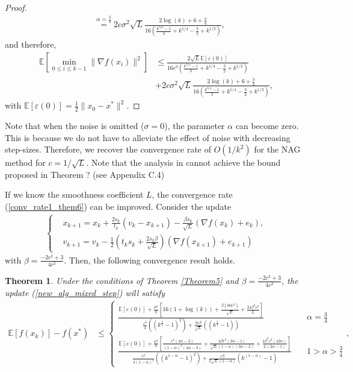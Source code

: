 \documentclass{article}
\theoremstyle{plain}
\newtheorem{thm}{\textbf{Theorem}}
\theoremstyle{definition}
\theoremstyle{remark}
\begin{document}
\begin{proof}
\begin{align}
  &\overset{\alpha=\tfrac{3}{4}}{=} 2c\sigma^2\sqrt{L}\frac{2\log (k)+6+\frac{3}{4}}{16\left( \frac{k^{3/4}-1}{3} +k^{1/4}-\frac{3}{2}+k^{1/2}\right)},
\end{align}
and therefore,
\begin{align}
    \mathbb E\left[\min_{0\leq i\leq k-1}\|\nabla f(x_i)\|^2 \right] &\leq \frac{2\sqrt{L}\mathbb E[\varepsilon (0)]}{16c^3\left( \frac{k^{3/4}-1}{3} +k^{1/4}-\frac{3}{2}+k^{1/2}\right)}\nonumber\\
    &+2c\sigma^2\sqrt{L}\frac{2\log (k)+6+\frac{3}{4}}{16\left( \frac{k^{3/4}-1}{3} +k^{1/4}-\frac{3}{2}+k^{1/2}\right)},
\end{align}
with $\mathbb E[\varepsilon(0)]=\tfrac{1}{2}\|x_0-x^*\|^2$.
\end{proof}
Note that when the noise is omitted ($\sigma=0$), the parameter $\alpha$ can become zero. This is because we do not have to alleviate the effect of noise with decreasing step-sizes. Therefore, we recover the convergence rate of $O(1/k^2)$ for the NAG method for $c=1/\sqrt{L}$.
Note that the analysis in \cite{pmlr-v108-laborde20a} cannot achieve the bound proposed in Theorem ? (see \cite{pmlr-v108-laborde20a} Appendix C.4)\par
If we know the smoothness coefficient $L$, the convergence rate (\ref{conv_rate1_them6}) can be improved. Consider the update
\begin{align}\label{new_alg_mixed_step}
    \left\{ \begin{array}{ll}
    &x_{k+1}   =    x_{k} + \frac{2s_k}{t_k}(v_k-x_{k+1})-\frac{\beta s_k}{\sqrt{L}}(\nabla f(x_k)+e_k),\\
     &v_{k+1}    = v_k -\tfrac{1}{2}(t_ks_k+\tfrac{2s_k \beta}{\sqrt{L}})(\nabla f(x_{k+1})+e_{k+1})
    \end{array}\right.
\end{align}
with $\beta = \tfrac{-2c^2+3}{4c^2}$. Then, the following convergence result holds.
\begin{thm}\label{Theorem6}
    Under the conditions of Theorem \ref{Theorem5} and $\beta = \tfrac{-2c^2+3}{4c^2}$, the update (\ref{new_alg_mixed_step}) will satisfy 
    \begin{align}\label{conv_rate1_them6}
    \mathbb E[f(x_k)]-f(x^*)&\leq \left\{\begin{array}{lr}
         \frac{\mathbb E[\varepsilon (0)]+\frac{\sigma^2}{8}\left[16(1+\log(k))+\frac{\beta(80c^3)}{\sqrt{L}}+\frac{24\beta^2c^2}{L}\right]}{\frac{c^2}{4}\left((k^{\frac{1}{4}}-1)^2\right)+\frac{2c\beta}{\sqrt{L}}\left((k^{\frac{1}{4}}-1)\right)} & \quad \alpha=\frac{3}{4} \\
          \frac{\mathbb E[\varepsilon (0)]+\frac{\sigma^2}{8}\left[\frac{c^4(4\alpha -2)}{(1-\alpha)^2(4\alpha-3)}+\frac{4\beta c^3(3\alpha -1)}{\sqrt{L}(1-\alpha)(3\alpha -2)}+\frac{4\beta^2c^2(42\alpha )}{L(2\alpha -1)}\right]}{\frac{c^2}{4(1-\alpha)^2}\left((k^{1-\alpha}-1)^2\right)+\frac{c\beta}{2\sqrt{L}(1-\alpha)}\left(k^{(1-\alpha)}-1\right)}& \quad 1>\alpha>\frac{3}{4}
    \end{array}\right.,
\end{align}
\end{thm}
\end{document}
